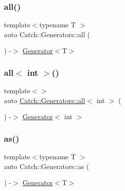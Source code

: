 \subsubsection{\texorpdfstring{all()}{all()}}
{\footnotesize\ttfamily template$<$typename T $>$ \\
auto Catch\+::\+Generators\+::all (\begin{DoxyParamCaption}{ }\end{DoxyParamCaption}) -\/$>$ \mbox{\hyperlink{class_catch_1_1_generators_1_1_generator}{Generator}}$<$T$>$ }

\mbox{\label{namespace_catch_1_1_generators_a45719d627af8d605990ee97722552f24}} 
\subsubsection{\texorpdfstring{all$<$ int $>$()}{all< int >()}}
{\footnotesize\ttfamily template$<$$>$ \\
auto \mbox{\hyperlink{namespace_catch_1_1_generators_a4f9b91d73905007d0e595ddde14c1c88}{Catch\+::\+Generators\+::all}}$<$ int $>$ (\begin{DoxyParamCaption}{ }\end{DoxyParamCaption}) -\/$>$  \mbox{\hyperlink{class_catch_1_1_generators_1_1_generator}{Generator}}$<$ int $>$}

\mbox{\label{namespace_catch_1_1_generators_a333605e85ee023accfcc0bd4ff69c322}} 
\subsubsection{\texorpdfstring{as()}{as()}}
{\footnotesize\ttfamily template$<$typename T $>$ \\
auto Catch\+::\+Generators\+::as (\begin{DoxyParamCaption}{ }\end{DoxyParamCaption}) -\/$>$ \mbox{\hyperlink{class_catch_1_1_generators_1_1_generator}{Generator}}$<$T$>$ }

\mbox{\label{namespace_catch_1_1_generators_a8cfefd03dff0bdbf025e475a36b76528}} 
